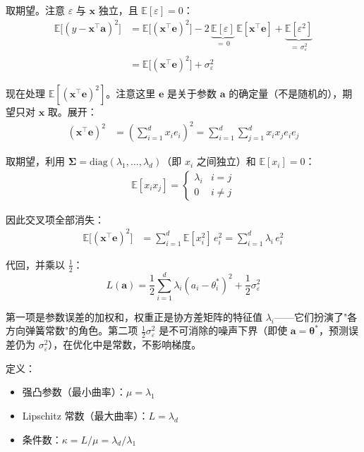 \documentclass[12pt, a4paper]{ctexart}
\begin{document}
取期望。注意 $\varepsilon$ 与 $\mathbf{x}$ 独立，且 $\mathbb{E}[\varepsilon] = 0$：
\begin{align}
    \mathbb{E}\bigl[(y - \mathbf{x}^\top\mathbf{a})^2\bigr] &= \mathbb{E}\bigl[(\mathbf{x}^\top\mathbf{e})^2\bigr] - 2\,\underbrace{\mathbb{E}[\varepsilon]}_{=\,0}\,\mathbb{E}[\mathbf{x}^\top\mathbf{e}] + \underbrace{\mathbb{E}[\varepsilon^2]}_{=\,\sigma_\varepsilon^2} \\
    &= \mathbb{E}\bigl[(\mathbf{x}^\top\mathbf{e})^2\bigr] + \sigma_\varepsilon^2
\end{align}

现在处理 $\mathbb{E}[(\mathbf{x}^\top\mathbf{e})^2]$。注意这里 $\mathbf{e}$ 是关于参数 $\mathbf{a}$ 的确定量（不是随机的），期望只对 $\mathbf{x}$ 取。展开：
\begin{align}
    (\mathbf{x}^\top\mathbf{e})^2 &= \left(\sum_{i=1}^d x_i e_i\right)^2 = \sum_{i=1}^d \sum_{j=1}^d x_i x_j e_i e_j
\end{align}

取期望，利用 $\boldsymbol{\Sigma} = \text{diag}(\lambda_1,\ldots,\lambda_d)$（即 $x_i$ 之间独立）和 $\mathbb{E}[x_i] = 0$：
\begin{align}
    \mathbb{E}[x_i x_j] = \begin{cases} \lambda_i & i = j \\ 0 & i \neq j \end{cases}
\end{align}

因此交叉项全部消失：
\begin{align}
    \mathbb{E}\bigl[(\mathbf{x}^\top\mathbf{e})^2\bigr] &= \sum_{i=1}^d \mathbb{E}[x_i^2]\,e_i^2 = \sum_{i=1}^d \lambda_i\,e_i^2
\end{align}

代回，并乘以 $\frac{1}{2}$：
\begin{equation}
    \boxed{L(\mathbf{a}) = \frac{1}{2}\sum_{i=1}^{d} \lambda_i (a_i - \theta_i^*)^2 + \frac{1}{2}\sigma_\varepsilon^2}
\end{equation}

第一项是参数误差的加权和，权重正是协方差矩阵的特征值 $\lambda_i$——它们扮演了"各方向弹簧常数"的角色。第二项 $\frac{1}{2}\sigma_\varepsilon^2$ 是不可消除的噪声下界（即使 $\mathbf{a} = \boldsymbol{\theta}^*$，预测误差仍为 $\sigma_\varepsilon^2$），在优化中是常数，不影响梯度。

定义：
\begin{itemize}
    \item 强凸参数（最小曲率）：$\mu = \lambda_1$
    \item Lipschitz 常数（最大曲率）：$L = \lambda_d$
    \item 条件数：$\kappa = L/\mu = \lambda_d/\lambda_1$
\end{itemize}
\end{document}
